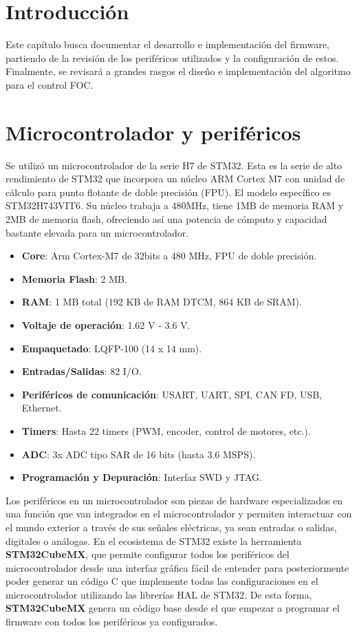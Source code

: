 \documentclass[11pt]{report}
\begin{document}
\section{Introducción}
Este capítulo busca documentar el desarrollo e implementación del firmware, partiendo de la revisión de los periféricos utilizados y la configuración de estos. Finalmente, se revisará a grandes rasgos el diseño e implementación del algoritmo para el control FOC.

\section{Microcontrolador y periféricos}
Se utilizó un microcontrolador de la serie H7 de STM32. Esta es la serie de alto rendimiento de STM32 que incorpora un núcleo ARM Cortex M7 con unidad de cálculo para punto flotante de doble precisión (FPU). El modelo específico es STM32H743VIT6. Su núcleo trabaja a 480MHz, tiene 1MB de memoria RAM y 2MB de memoria flash, ofreciendo así una potencia de cómputo y capacidad bastante elevada para un microcontrolador.

\begin{itemize}
	\item \textbf{Core}: Arm Cortex-M7 de 32bits a 480 MHz, FPU de doble precisión.
	\item \textbf{Memoria Flash}: 2 MB.
	\item \textbf{RAM}: 1 MB total (192 KB de RAM DTCM, 864 KB de SRAM).
	\item \textbf{Voltaje de operación}: 1.62 V - 3.6 V.
	\item \textbf{Empaquetado}: LQFP-100 (14 x 14 mm).
	\item \textbf{Entradas/Salidas}: 82 I/O.
	\item \textbf{Periféricos de comunicación}: USART, UART, SPI, CAN FD, USB, Ethernet.
	\item \textbf{Timers}: Hasta 22 timers (PWM, encoder, control de motores, etc.).
	\item \textbf{ADC}: 3x ADC tipo SAR de 16 bits (hasta 3.6 MSPS).
	\item \textbf{Programación y Depuración}: Interfaz SWD y JTAG.
\end{itemize}

Los periféricos en un microcontrolador son piezas de hardware especializados en una función que van integrados en el microcontrolador y permiten interactuar con el mundo exterior a través de sus señales eléctricas, ya sean entradas o salidas, digitales o análogas. En el ecosistema de STM32 existe la herramienta \textbf{STM32CubeMX}, que permite configurar todos los periféricos del microcontrolador desde una interfaz gráfica fácil de entender para posteriormente poder generar un código C que implemente todas las configuraciones en el microcontrolador utilizando las librerías HAL de STM32. De esta forma, \textbf{STM32CubeMX} genera un código base desde el que empezar a programar el firmware con todos los periféricos ya configurados.
\end{document}
